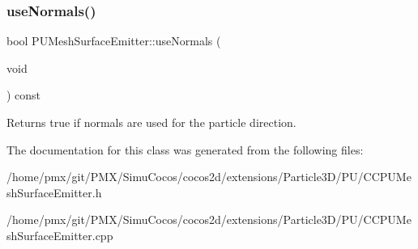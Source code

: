 \subsubsection{\texorpdfstring{use\+Normals()}{useNormals()}\hspace{0.1cm}{\footnotesize\ttfamily [2/2]}}
{\footnotesize\ttfamily bool P\+U\+Mesh\+Surface\+Emitter\+::use\+Normals (\begin{DoxyParamCaption}\item[{void}]{ }\end{DoxyParamCaption}) const}

Returns true if normals are used for the particle direction. 

The documentation for this class was generated from the following files\+:\begin{DoxyCompactItemize}
\item 
/home/pmx/git/\+P\+M\+X/\+Simu\+Cocos/cocos2d/extensions/\+Particle3\+D/\+P\+U/C\+C\+P\+U\+Mesh\+Surface\+Emitter.\+h\item 
/home/pmx/git/\+P\+M\+X/\+Simu\+Cocos/cocos2d/extensions/\+Particle3\+D/\+P\+U/C\+C\+P\+U\+Mesh\+Surface\+Emitter.\+cpp\end{DoxyCompactItemize}
